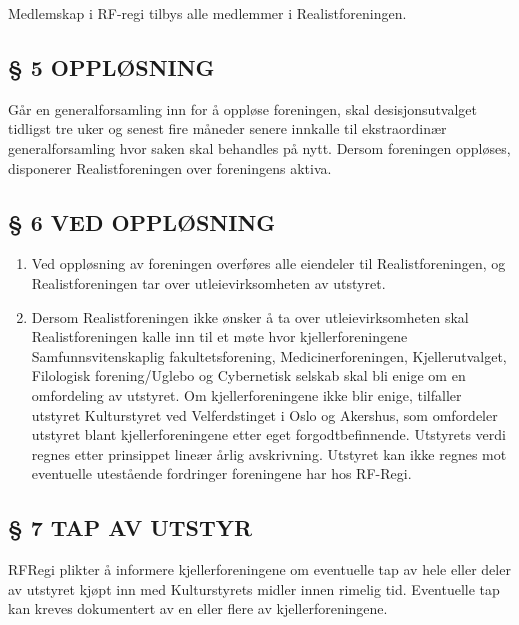 \documentclass[a4paper,11pt,norsk]{scrartcl}
\begin{document}
Medlemskap i RF-regi tilbys alle medlemmer i Realistforeningen.


\subsection{§ 5 OPPLØSNING%
  \label{opplosning}%
}

Går en generalforsamling inn for å oppløse foreningen, skal
desisjonsutvalget tidligst tre uker og senest fire måneder senere
innkalle til ekstraordinær generalforsamling hvor saken skal behandles
på nytt. Dersom foreningen oppløses, disponerer Realistforeningen
over foreningens aktiva.


\subsection{§ 6 VED OPPLØSNING%
  \label{ved-opplosning}%
}

\begin{enumerate}
\renewcommand{\labelenumi}{\alph{enumi})}
\item Ved oppløsning av foreningen overføres alle eiendeler til
Realistforeningen, og Realistforeningen  tar over utleievirksomheten av
utstyret.

\item Dersom Realistforeningen ikke ønsker å ta over utleievirksomheten skal
Realistforeningen kalle inn til et møte hvor kjellerforeningene Samfunnsvitenskaplig
fakultetsforening, Medicinerforeningen, Kjellerutvalget, Filologisk
forening/Uglebo og Cybernetisk selskab skal
bli enige om en omfordeling av utstyret. Om kjellerforeningene ikke blir enige,
tilfaller utstyret Kulturstyret ved Velferdstinget i Oslo og Akershus, som
omfordeler utstyret blant kjellerforeningene etter eget forgodtbefinnende.
Utstyrets verdi regnes etter prinsippet lineær årlig avskrivning. Utstyret
kan ikke regnes mot eventuelle utestående fordringer foreningene har hos RF-Regi.
\end{enumerate}


\subsection{§ 7 TAP AV UTSTYR%
  \label{tap-av-utstyr}%
}

RF\-Regi plikter å informere kjellerforeningene om eventuelle tap av hele eller
deler av utstyret kjøpt inn med Kulturstyrets midler innen rimelig tid.
Eventuelle tap kan kreves dokumentert av en eller flere av kjellerforeningene.
\end{document}
